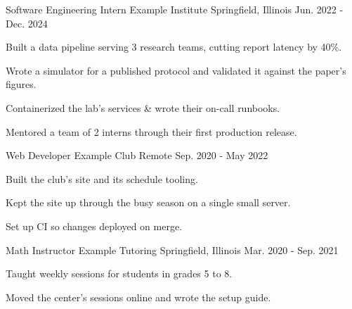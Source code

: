 

\begin{cventries}

  \cventry
    {Software Engineering Intern}
    {Example Institute}
    {Springfield, Illinois}
    {Jun. 2022 - Dec. 2024}
    {
      \begin{cvitems}
        \item {Built a data pipeline serving 3 research teams, cutting report latency by 40\%.}
        \item {Wrote a simulator for a published protocol and validated it against the paper's figures.}
        \item {Containerized the lab's services \& wrote their on-call runbooks.}
        \item {Mentored a team of 2 interns through their first production release.}
      \end{cvitems}
    }

  \cventry
    {Web Developer}
    {Example Club}
    {Remote}
    {Sep. 2020 - May 2022}
    {
      \begin{cvitems}
        \item {Built the club's site and its schedule tooling.}
        \item {Kept the site up through the busy season on a single small server.}
        \item {Set up CI so changes deployed on merge.}
      \end{cvitems}
    }

  \cventry
    {Math Instructor}
    {Example Tutoring}
    {Springfield, Illinois}
    {Mar. 2020 - Sep. 2021}
    {
      \begin{cvitems}
        \item {Taught weekly sessions for students in grades 5 to 8.}
        \item {Moved the center's sessions online and wrote the setup guide.}
      \end{cvitems}
    }

\end{cventries}
